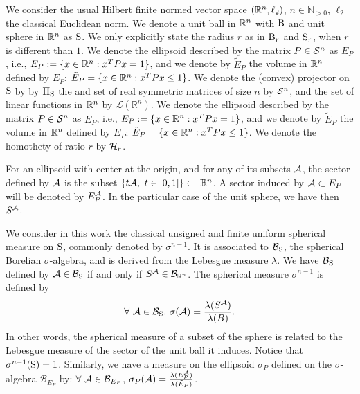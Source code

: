 We consider the usual Hilbert finite normed vector space $(\mathbb{R}^n,\ell_2)$, $n \in \mathbb{N}_{> 0}$, $\ell_2$ the classical Euclidean norm. We denote a unit ball in $\mathbb{R}^n$ with $\text{B}$ and unit sphere in $\mathbb{R}^n$ as $\text{S}$. We only explicitly state the radius $r$ as in $\text{B}_r$ and $\text{S}_r$, when $r$ is different than $1$. We denote the ellipsoid described by the matrix $P \in \mathcal{S}^n$ as $E_P$, i.e., $E_P:= \{x \in \mathbb{R}^n: x^TPx = 1\}$, and we denote by $\tilde{E}_P$ the volume in $\mathbb{R}^n$ defined by $E_P$: $\tilde{E}_P = \{x \in \mathbb{R}^n: x^TPx \leq 1\}$. We denote the (convex) projector on $\text{S}$ by  by $\Pi_{\text{S}}$ the and set of real symmetric matrices of size $n$ by $\mathcal{S}^n$, and the set of linear functions in $\mathbb{R}^n$ by $\mathcal{L}(\mathbb{R}^n)$. We denote the ellipsoid described by the matrix $P \in \mathcal{S}^n$ as $E_P$, i.e., $E_P:= \{x \in \mathbb{R}^n: x^TPx = 1\}$, and we denote by $\tilde{E}_P$ the volume in $\mathbb{R}^n$ defined by $E_P$: $\tilde{E}_P = \{x \in \mathbb{R}^n: x^TPx \leq 1\}$. We denote the homothety of ratio $r$ by $\mathcal{H}_{r}$. 


For an ellipsoid with center at the origin, and for any of its subsets $\mathcal{A}$, the sector defined by $\mathcal{A}$ is the subset $\{t \mathcal{A}, \ t \in [0,1]\} \subset\ \mathbb{R}^n$. A sector induced by $\mathcal{A} \subset E_P$ will be denoted by $E_P^{\mathcal{A}}$. In the particular case of the unit sphere, we have then $S^{\mathcal{A}}$.

We consider in this work the classical unsigned and finite uniform spherical measure on $\text{S}$, commonly denoted by $\sigma^{n-1}$. It is associated to $\mathcal{B}_{\text{S}}$, the spherical Borelian $\sigma$-algebra, and is derived from the Lebesgue measure $\lambda$. We have $\mathcal{B}_{\text{S}}$ defined by $\mathcal{A} \in \mathcal{B}_{\text{S}}$ if and only if $S^{\mathcal{A}} \in \mathcal{B}_{\mathbb{R}^n}$. The spherical measure $\sigma^{n-1}$ is defined by
$$\forall\ \mathcal{A} \in \mathcal{B}_{\text{S}},\, \sigma(\mathcal{A}) = \frac{\lambda(S^{\mathcal{A}})}{\lambda(B)}. $$
In other words, the spherical measure of a subset of the sphere is related to the Lebesgue measure of the sector of the unit ball it induces. Notice that $\sigma^{n-1}(\text{S}) = 1$.
Similarly, we have a measure on the ellipsoid $\sigma_P$ defined on the $\sigma$-algebra $\mathcal{B}_{E_P}$ by: $\forall\ \mathcal{A} \in \mathcal{B}_{E_P}$, $\sigma_P(\mathcal{A}) = \frac{\lambda(E_P^{\mathcal{A}})}{\lambda(\tilde{E}_P)}$.
